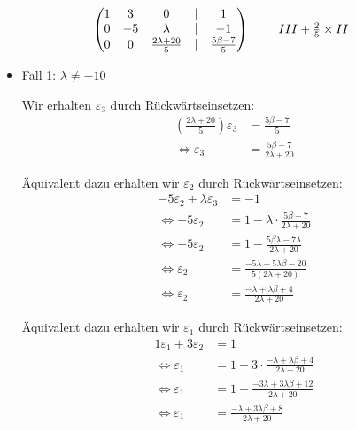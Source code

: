 \documentclass[a4paper]{scrartcl}
\begin{document}
\[
\begin{array}{c@{\hspace{2em}}l}
\begin{pmatrix}
1 & 3 & 0 & | & 1 \\
0 & -5 & \lambda & | & -1 \\
0 & 0 & \frac{2 \lambda + 20}{5} & | & \frac{5 \beta - 7}{5}
\end{pmatrix}
&
\begin{array}{l}
III + \frac{2}{5} \times II
\end{array}
\end{array}
\]

\begin{itemize}
  \item Fall 1: $\lambda \neq -10$
  
  Wir erhalten $\varepsilon_3$ durch Rückwärtseinsetzen:
  \begin{align*}
    (\frac{2\lambda + 20}{5})\varepsilon_3 &= \frac{5\beta - 7}{5} \\
    \Leftrightarrow \varepsilon_3 &= \frac{5\beta - 7}{2\lambda + 20}
  \end{align*}

  Äquivalent dazu erhalten wir $\varepsilon_2$ durch Rückwärtseinsetzen:
  \begin{align*}
    -5\varepsilon_2 + \lambda \varepsilon_3 &= -1 \\
    \Leftrightarrow -5 \varepsilon_2 &= 1 - \lambda \cdot \frac{5\beta - 7}{2\lambda + 20} \\
    \Leftrightarrow -5 \varepsilon_2 &=  1 - \frac{5\beta \lambda - 7 \lambda}{2\lambda + 20} \\
    \Leftrightarrow \varepsilon_2 &= \frac{-5 \lambda - 5 \lambda \beta - 20}{5(2\lambda + 20)} \\
    \Leftrightarrow \varepsilon_2 &= \frac{-\lambda + \lambda \beta + 4}{2\lambda + 20}
  \end{align*}

  Äquivalent dazu erhalten wir $\varepsilon_1$ durch Rückwärtseinsetzen:
  \begin{align*}
    1 \varepsilon_1 + 3 \varepsilon_2 &= 1 \\
    \Leftrightarrow \varepsilon_1 &= 1 - 3 \cdot \frac{-\lambda + \lambda \beta + 4}{2\lambda + 20} \\
    \Leftrightarrow \varepsilon_1 &= 1 - \frac{-3\lambda + 3\lambda \beta + 12}{2\lambda + 20} \\
    \Leftrightarrow \varepsilon_1 &= \frac{-\lambda +3 \lambda \beta + 8}{2\lambda + 20} \\
  \end{align*}


\end{itemize}
\end{document}
